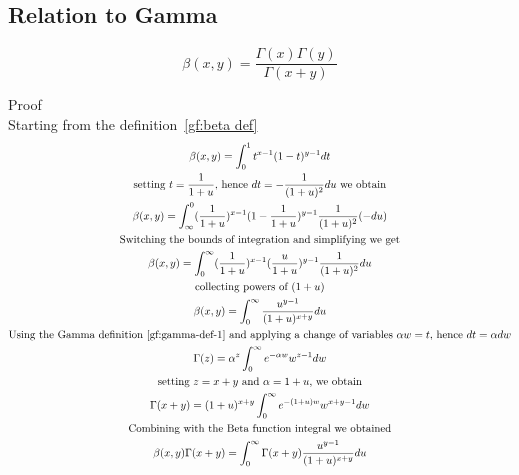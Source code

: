 \documentclass[a4paper]{article}
\begin{document}
    \subsection{Relation to Gamma}\label{gf:subsec:relation-to-gamma}
    \begin{theorem}
        \label{gf:relation to beta}
        \begin{equation}
            \boxed{
                \beta(x, y) = \frac{\Gamma(x) \Gamma(y)}{\Gamma(x+y)}
            }\label{gf:eq:equation24}
        \end{equation}

        Proof
        \\
        Starting from the definition~\ref{gf:beta def}
        \begin{gather*}
            \beta(x, y) = \int_{0}^{1} t^{x-1} (1-t)^{y-1} dt
            \\
            \text{setting $t = \frac{1}{1+u}$, hence $dt = -\frac{1}{(1+u)^2} du$ we obtain}
            \\
            \beta(x, y) = \int_{\infty}^{0} (\frac{1}{1+u})^{x-1} (1-\frac{1}{1+u})^{y-1} \frac{1}{(1+u)^2} (-du)
            \\
            \text{Switching the bounds of integration and simplifying we get}
            \\
            \beta(x, y) = \int_{0}^{\infty} (\frac{1}{1+u})^{x-1} (\frac{u}{1+u})^{y-1} \frac{1}{(1+u)^2} du
            \\
            \text{collecting powers of $(1+u)$}
            \\
            \beta(x, y) = \int_{0}^{\infty}
            \frac{u^{y-1}}{(1+u)^{x+y}} du
            \\
            \text{Using the Gamma definition~\ref{gf:gamma-def-1} and applying a change of variables $\alpha w = t$, hence $dt = \alpha dw$}
            \\
            \Gamma(z) = \alpha^z  \int_{0}^{\infty} e^{-\alpha w} w^{z-1} dw
            \\
            \text{setting $z = x+y$ and $\alpha = 1+u$, we obtain}
            \\
            \Gamma(x+y) = (1+u)^{x+y}  \int_{0}^{\infty} e^{-(1+u) w} w^{x+y-1} dw
            \\
            \text{Combining with the Beta function integral we obtained}
            \\
            \beta(x, y) \Gamma(x+y) = \int_{0}^{\infty}  \Gamma(x+y) \frac{u^{y-1}}{(1+u)^{x+y}} du
            \\

\end{gather*}
\end{theorem}
\end{document}
